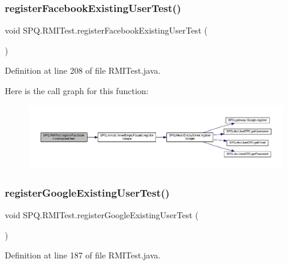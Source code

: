 \subsubsection{\texorpdfstring{register\+Facebook\+Existing\+User\+Test()}{registerFacebookExistingUserTest()}}
{\footnotesize\ttfamily void S\+P\+Q.\+R\+M\+I\+Test.\+register\+Facebook\+Existing\+User\+Test (\begin{DoxyParamCaption}{ }\end{DoxyParamCaption})}



Definition at line 208 of file R\+M\+I\+Test.\+java.

Here is the call graph for this function\+:
\nopagebreak
\begin{figure}[H]
\begin{center}
\leavevmode
\includegraphics[width=350pt]{class_s_p_q_1_1_r_m_i_test_aebfcce491b9fa13cafa971bac73f88b8_cgraph}
\end{center}
\end{figure}
\mbox{\label{class_s_p_q_1_1_r_m_i_test_ad375aaea37b3b8f68c670f4c09834a7b}} 
\subsubsection{\texorpdfstring{register\+Google\+Existing\+User\+Test()}{registerGoogleExistingUserTest()}}
{\footnotesize\ttfamily void S\+P\+Q.\+R\+M\+I\+Test.\+register\+Google\+Existing\+User\+Test (\begin{DoxyParamCaption}{ }\end{DoxyParamCaption})}



Definition at line 187 of file R\+M\+I\+Test.\+java.

